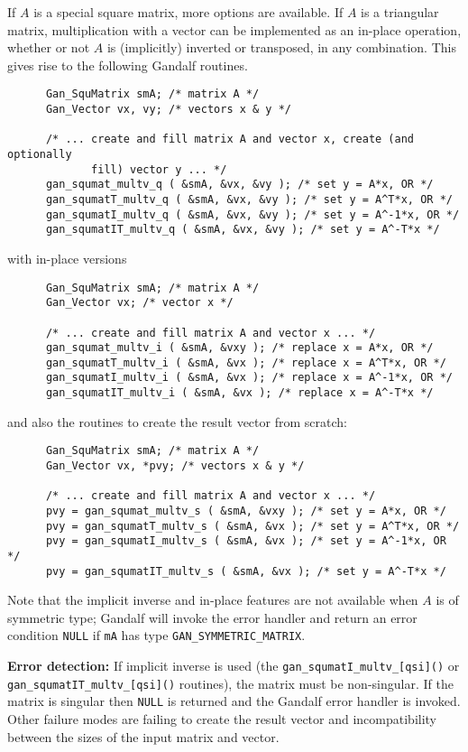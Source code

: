 If $A$ is a special square matrix, more options are available. If $A$ is
a triangular matrix, multiplication with a vector can be implemented as
an in-place operation, whether or not $A$ is (implicitly) inverted or
transposed, in any combination. This gives rise to the following Gandalf
routines.
\begin{verbatim}
      Gan_SquMatrix smA; /* matrix A */
      Gan_Vector vx, vy; /* vectors x & y */

      /* ... create and fill matrix A and vector x, create (and optionally
             fill) vector y ... */
      gan_squmat_multv_q ( &smA, &vx, &vy ); /* set y = A*x, OR */
      gan_squmatT_multv_q ( &smA, &vx, &vy ); /* set y = A^T*x, OR */
      gan_squmatI_multv_q ( &smA, &vx, &vy ); /* set y = A^-1*x, OR */
      gan_squmatIT_multv_q ( &smA, &vx, &vy ); /* set y = A^-T*x */
\end{verbatim}
with in-place versions
\begin{verbatim}
      Gan_SquMatrix smA; /* matrix A */
      Gan_Vector vx; /* vector x */

      /* ... create and fill matrix A and vector x ... */
      gan_squmat_multv_i ( &smA, &vxy ); /* replace x = A*x, OR */
      gan_squmatT_multv_i ( &smA, &vx ); /* replace x = A^T*x, OR */
      gan_squmatI_multv_i ( &smA, &vx ); /* replace x = A^-1*x, OR */
      gan_squmatIT_multv_i ( &smA, &vx ); /* replace x = A^-T*x */
\end{verbatim}
and also the routines to create the result vector from scratch:
\begin{verbatim}
      Gan_SquMatrix smA; /* matrix A */
      Gan_Vector vx, *pvy; /* vectors x & y */

      /* ... create and fill matrix A and vector x ... */
      pvy = gan_squmat_multv_s ( &smA, &vxy ); /* set y = A*x, OR */
      pvy = gan_squmatT_multv_s ( &smA, &vx ); /* set y = A^T*x, OR */
      pvy = gan_squmatI_multv_s ( &smA, &vx ); /* set y = A^-1*x, OR */
      pvy = gan_squmatIT_multv_s ( &smA, &vx ); /* set y = A^-T*x */
\end{verbatim}
Note that the implicit inverse and in-place features are not available when
$A$ is of symmetric type; Gandalf will invoke the error handler and return
an error condition {\tt NULL} if {\tt mA} has type
{\tt GAN\_SYMMETRIC\_MATRIX}.

{\bf Error detection:} If implicit inverse is used (the
{\tt gan\_squmatI\_multv\_[qsi]()} or {\tt gan\_squmatIT\_multv\_[qsi]()}
routines), the matrix must be non-singular. If the matrix is singular
then {\tt NULL} is returned and the Gandalf error handler is invoked.
Other failure modes are failing to create the result vector and incompatibility
between the sizes of the input matrix and vector.

